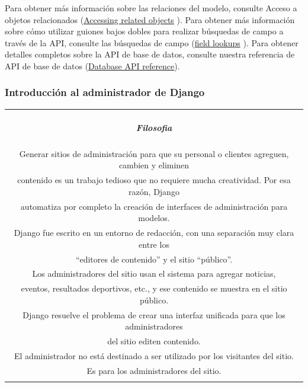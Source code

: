 \documentclass[10pt]{article}
\newcommand{\django}[1]{{\textcolor{G}{Django} #1}}
\begin{document}
Para obtener más información sobre las relaciones del modelo, consulte Acceso a objetos relacionados ({\href{https://docs.djangoproject.com/en/3.0/ref/models/relations/}{\textcolor{B}{Accessing related objects}}}
). Para obtener más información sobre cómo utilizar guiones bajos dobles para realizar búsquedas de campo a través de la API, consulte las búsquedas de campo ({\href{https://docs.djangoproject.com/en/3.0/topics/db/queries/\#field-lookups-intro}{\textcolor{B}{field lookups}}}
). Para obtener detalles completos sobre la API de base de datos, consulte nuestra referencia de API de base de datos ({\href{https://docs.djangoproject.com/en/3.0/topics/db/queries/}{\textcolor{B}{Database API reference}}}).

\subsubsection{Introducción al administrador de \django{}}

\begin{table}[H]
	\begin{tabular}{||c||}
	\hline \\
	\begin{Large}
	\textbf{\textit{Filosofia}}
	\end{Large}
	\\\\		
Generar sitios de administración para que su personal o clientes agreguen, cambien y eliminen\\ contenido es un trabajo tedioso que no requiere mucha creatividad. Por esa razón, \django{}\\ automatiza por completo la creación de interfaces de administración para modelos.\\

\django{} fue escrito en un entorno de redacción, con una separación muy clara entre los \\ ``editores de contenido'' y el sitio ``público''.\\ Los administradores del sitio usan el sistema para agregar noticias, \\ eventos, resultados deportivos, etc., y ese contenido se muestra en el sitio público.\\ \django{} resuelve el problema de crear una interfaz unificada para que los administradores \\ del sitio editen contenido.\\

El administrador no está destinado a ser utilizado por los visitantes del sitio.\\ Es para los administradores del sitio.
\\\\ \hline 	
			\end{tabular}
		\end{table}		
\end{document}
